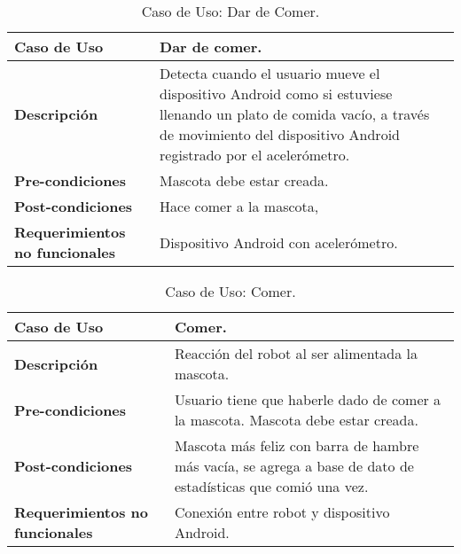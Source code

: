 \begin{table}[htbp!]
  \centering
  \begin{tabular}{|p{4cm}|p{6cm}|}\hline
    \bf{Caso de Uso}                   & Dar de comer. \\ \hline
    \bf{Descripci\'on}                 & Detecta cuando el usuario mueve el dispositivo Android como si estuviese llenando un plato de comida vac\'io, a trav\'es de movimiento del dispositivo Android registrado por el aceler\'ometro. \\ \hline
    \bf{Pre-condiciones}               & Mascota debe estar creada. \\ \hline
    \bf{Post-condiciones}              & Hace comer a la mascota,   \\ \hline
    \bf{Requerimientos no funcionales} & Dispositivo Android con aceler\'ometro. \\ \hline
  \end{tabular}
  \caption[~Caso de Uso: Dar de Comer]{Caso de Uso: Dar de Comer.}
  \label{table:DarComer}
\end{table}

\begin{table}[htbp!]
  \centering
  \begin{tabular}{|p{4cm}|p{6cm}|}\hline
    \bf{Caso de Uso}                   & Comer. \\ \hline
    \bf{Descripci\'on}                 & Reacci\'on del robot al ser alimentada la mascota. \\ \hline
    \bf{Pre-condiciones}               & Usuario tiene que haberle dado de comer a la mascota. Mascota debe estar creada. \\ \hline
    \bf{Post-condiciones}              & Mascota m\'as feliz con barra de hambre m\'as vac\'ia, se agrega a base de dato de estad\'isticas que comi\'o una vez. \\ \hline
    \bf{Requerimientos no funcionales} & Conexi\'on entre robot y dispositivo Android. \\ \hline
  \end{tabular}
  \caption[~~Caso de Uso: Comer]{Caso de Uso: Comer.}
  \label{table:Comer}
\end{table}

